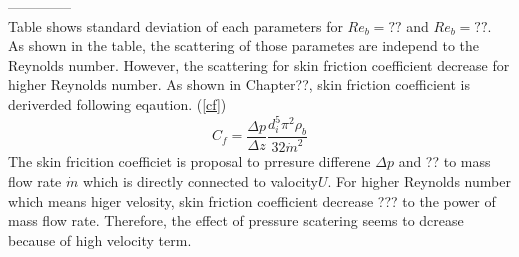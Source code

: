 \documentclass[12pt,oneside]{jbook}
\begin{document}
--------------\\
Table shows standard deviation of each parameters for $Re_{b}=??$ and $Re_{b}=??$.
As shown in the table, the scattering of those parametes are independ to the Reynolds number.
However, the scattering for skin friction coefficient decrease for higher Reynolds number.
As shown in Chapter??, skin friction coefficient is deriverded following eqaution. (\ref{cf})
\begin{equation}
    C_{f} = \frac{\Delta p}{\Delta z} \frac{d_{i}^{5}\pi^{2}\rho_{b}}{32\dot{m}^{2}}
    \label{cf}
\end{equation}
The skin fricition coefficiet is proposal to prresure differene $\Delta p$ and ?? to mass flow rate $\dot{m}$ which is directly connected to valocity$U$.
For higher Reynolds number which means higer velosity, skin friction coefficient decrease ??? to the power of mass flow rate.
Therefore, the effect of pressure scatering seems to dcrease because of high velocity term.\\
\end{document}
